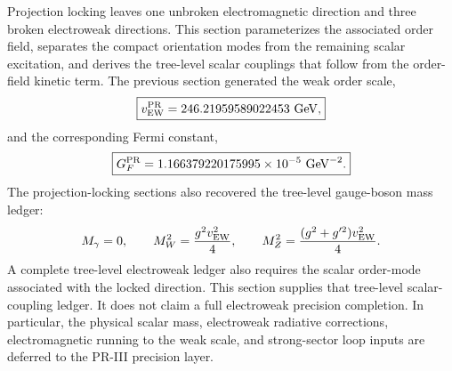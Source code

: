 \documentclass[11pt]{article}
\begin{document}
Projection locking leaves one unbroken electromagnetic direction and three broken electroweak directions. This section parameterizes the associated order field, separates the compact orientation modes from the remaining scalar excitation, and derives the tree-level scalar couplings that follow from the order-field kinetic term. The previous section generated the weak order scale,
\begin{equation}
\boxed{
v_{\rm EW}^{\rm PR}
=
246.21959589022453\ {\rm GeV},}
\end{equation}
and the corresponding Fermi constant,
\begin{equation}
\boxed{
G_F^{\rm PR}
=
1.166379220175995\times10^{-5}\ {\rm GeV}^{-2}.}
\end{equation}
The projection-locking sections also recovered the tree-level gauge-boson mass ledger:
\begin{equation}
M_\gamma=0,
\qquad
M_W^2=\frac{g^2v_{\rm EW}^2}{4},
\qquad
M_Z^2=\frac{(g^2+g'^2)v_{\rm EW}^2}{4}.
\end{equation}
A complete tree-level electroweak ledger also requires the scalar order-mode associated with the locked direction. 
This section supplies that tree-level scalar-coupling ledger. 
It does not claim a full electroweak precision completion. 
In particular, the physical scalar mass, electroweak radiative corrections, electromagnetic running to the weak scale, and strong-sector loop inputs are deferred to the PR-III precision layer.
\end{document}
